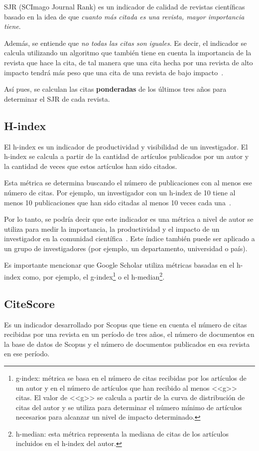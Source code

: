 SJR (SCImago Journal Rank) es un indicador de calidad de revistas científicas basado en la idea de que \textit{cuanto más citada es una revista, mayor importancia tiene}. 

Además, se entiende que \textit{no todas las citas son iguales}\cite{Svetla2022}. Es decir, el indicador se calcula utilizando un algoritmo que también tiene en cuenta la importancia de la revista que hace la cita, de tal manera que una cita hecha por una revista de alto impacto tendrá más peso que una cita de una revista de bajo impacto~\cite{Svetla2022}. 

Así pues, se calculan las citas \textbf{ponderadas} de los últimos tres años para determinar el SJR de cada revista.

\subsection{H-index}
El h-index es un indicador de productividad y visibilidad de un investigador. El h-index se calcula a partir de la cantidad de artículos publicados por un autor y la cantidad de veces que estos artículos han sido citados. 

Esta métrica se determina buscando el número de publicaciones con al menos ese número de citas. Por ejemplo, un investigador con un h-index de 10 tiene al menos 10 publicaciones que han sido citadas al menos 10 veces cada una~\cite{Svetla2022}. 

Por lo tanto, se podría decir que este indicador es una métrica a nivel de autor se utiliza para medir la importancia, la productividad y el impacto de un investigador en la comunidad científica~\cite{Svetla2022}. Este índice también puede ser aplicado a un grupo de investigadores (por ejemplo, un departamento, universidad o país).

Es importante mencionar que Google Scholar utiliza métricas basadas en el h-index como, por ejemplo, el g-index\footnote{g-index: métrica se basa en el número de citas recibidas por los artículos de un autor y en el número de artículos que han recibido al menos <<g>> citas. El valor de <<g>> se calcula a partir de la curva de distribución de citas del autor y se utiliza para determinar el número mínimo de artículos necesarios para alcanzar un nivel de impacto determinado.} o el h-median\footnote{h-median: esta métrica representa la mediana de citas de los artículos incluidos en el h-index del autor.}.

\subsection{CiteScore}
Es un indicador desarrollado por Scopus que tiene en cuenta el número de citas recibidas por una revista en un período de tres años, el número de documentos en la base de datos de Scopus y el número de documentos publicados en esa revista en ese período.

